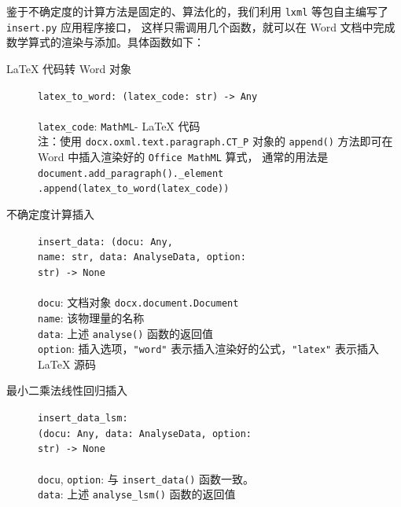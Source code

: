 鉴于不确定度的计算方法是固定的、算法化的，我们利用 \verb|lxml| 等包自主编写了 \verb|insert.py| 应用程序接口，
这样只需调用几个函数，就可以在 Word 文档中完成数学算式的渲染与添加。具体函数如下：

\begin{description}
  \item[\LaTeX{} 代码转 Word 对象] \verb|latex_to_word: (latex_code: str) -> Any|\\
  \\
  \verb|latex_code|: \verb|MathML|- \LaTeX{} 代码\\
  注：使用 \verb|docx.oxml.text.paragraph.CT_P| 对象的 \verb|append()| 方法即可在 Word 中插入渲染好的 \texttt{Office MathML} 算式，
  通常的用法是 \verb|document.add_paragraph()._element|\\\verb|.append(latex_to_word(latex_code))|
  \item[不确定度计算插入] \verb|insert_data: (docu: Any,|\\\verb|name: str, data: AnalyseData, option:|\\\verb|str) -> None|\\
  \\
  \verb|docu|: 文档对象 \verb|docx.document.Document|\\
  \verb|name|: 该物理量的名称\\
  \verb|data|: 上述 \verb|analyse()| 函数的返回值\\
  \verb|option|: 插入选项，\verb|"word"| 表示插入渲染好的公式，\verb|"latex"| 表示插入 \LaTeX{} 源码
  \item[最小二乘法线性回归插入] \verb|insert_data_lsm:|\\\verb|(docu: Any, data: AnalyseData, option:|\\\verb|str) -> None|\\
  \\
  \verb|docu|, \verb|option|: 与 \verb|insert_data()| 函数一致。\\
  \verb|data|: 上述 \verb|analyse_lsm()| 函数的返回值
\end{description}